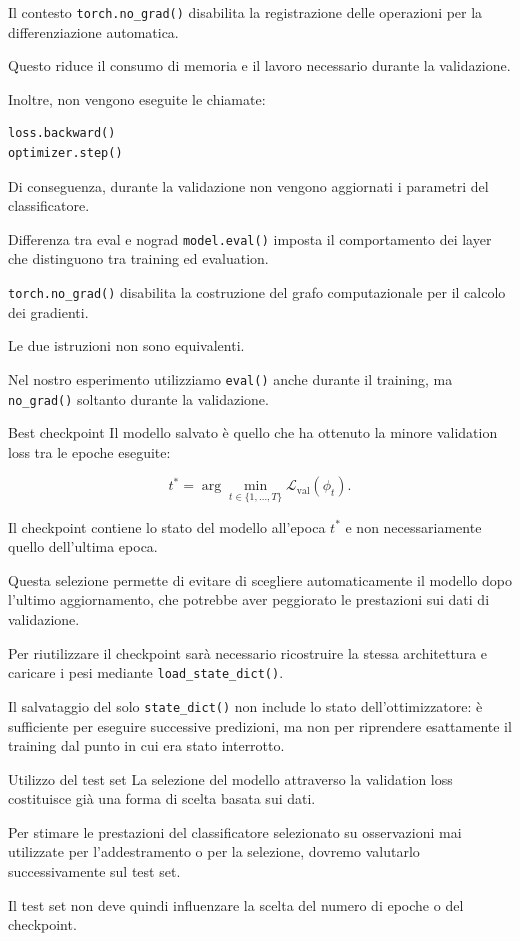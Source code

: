 \documentclass[10pt,a4paper,oneside]{book}
\begin{document}
Il contesto \texttt{torch.no\_grad()} disabilita
la registrazione delle operazioni per la
differenziazione automatica.

Questo riduce il consumo di memoria e il lavoro
necessario durante la validazione.

Inoltre, non vengono eseguite le chiamate:

\begin{verbatim}
loss.backward()
optimizer.step()
\end{verbatim}

Di conseguenza, durante la validazione non vengono
aggiornati i parametri del classificatore.

\begin{importantbox}{Differenza tra eval e nograd}
\texttt{model.eval()} imposta il comportamento
dei layer che distinguono tra training ed evaluation.

\texttt{torch.no\_grad()} disabilita la costruzione
del grafo computazionale per il calcolo dei gradienti.

Le due istruzioni non sono equivalenti.

Nel nostro esperimento utilizziamo
\texttt{eval()} anche durante il training,
ma \texttt{no\_grad()} soltanto durante
la validazione.
\end{importantbox}

\begin{importantbox}{Best checkpoint}
Il modello salvato è quello che ha ottenuto
la minore validation loss tra le epoche eseguite:

\[
t^*
=
\arg\min_{t\in\{1,\ldots,T\}}
\mathcal{L}_{\mathrm{val}}(\phi_t).
\]

Il checkpoint contiene lo stato del modello
all'epoca $t^*$ e non necessariamente quello
dell'ultima epoca.

Questa selezione permette di evitare di scegliere
automaticamente il modello dopo l'ultimo
aggiornamento, che potrebbe aver peggiorato
le prestazioni sui dati di validazione.

Per riutilizzare il checkpoint sarà necessario
ricostruire la stessa architettura e caricare
i pesi mediante \texttt{load\_state\_dict()}.

Il salvataggio del solo \texttt{state\_dict()}
non include lo stato dell'ottimizzatore:
è sufficiente per eseguire successive predizioni,
ma non per riprendere esattamente il training
dal punto in cui era stato interrotto.
\end{importantbox}

\begin{warningbox}{Utilizzo del test set}
La selezione del modello attraverso la validation loss
costituisce già una forma di scelta basata sui dati.

Per stimare le prestazioni del classificatore
selezionato su osservazioni mai utilizzate
per l'addestramento o per la selezione,
dovremo valutarlo successivamente sul test set.

Il test set non deve quindi influenzare
la scelta del numero di epoche o del checkpoint.
\end{warningbox}
\end{document}
